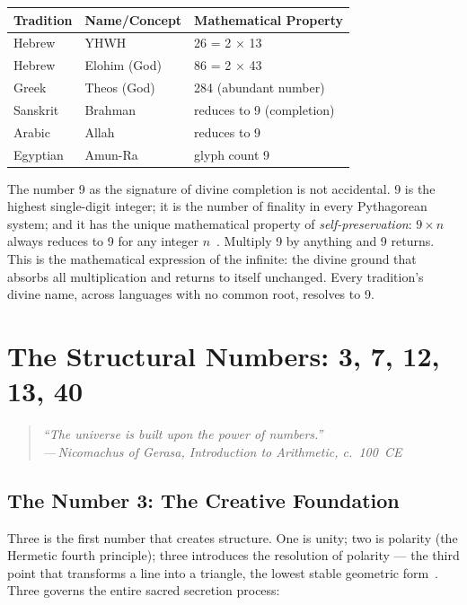 \documentclass[12pt, a4paper]{article}
\newcommand{\epigraph}[2]{%
  \begin{quote}
    \itshape ``#1''\\[0.3em]
    \normalfont\small\hfill ---\,#2
  \end{quote}
}
\begin{document}
\begin{center}
\begin{tabular}{C{3cm} C{4cm} C{4cm}}
\toprule
\textbf{Tradition} & \textbf{Name/Concept} & \textbf{Mathematical Property} \\
\midrule
Hebrew & YHWH & 26 = 2 × 13 \\
Hebrew & Elohim (God) & 86 = 2 × 43 \\
Greek & Theos (God) & 284 (abundant number) \\
Sanskrit & Brahman & reduces to 9 (completion) \\
Arabic & Allah & reduces to 9 \\
Egyptian & Amun-Ra & glyph count 9 \\
\bottomrule
\end{tabular}
\end{center}

\vspace{1em}

The number 9 as the signature of divine completion is not accidental. 9 is the
highest single-digit integer; it is the number of finality in every
Pythagorean system; and it has the unique mathematical property of
\emph{self-preservation}: $9 \times n$ always reduces to 9 for any integer
$n$~\autocite{westcott1911}. Multiply 9 by anything and 9 returns. This is
the mathematical expression of the infinite: the divine ground that absorbs
all multiplication and returns to itself unchanged. Every tradition's divine
name, across languages with no common root, resolves to 9.

\section{The Structural Numbers: 3, 7, 12, 13, 40}
\label{sec:structural}

\epigraph{The universe is built upon the power of numbers.}{Nicomachus of
Gerasa, \emph{Introduction to Arithmetic}, c.~100~CE}

\subsection{The Number 3: The Creative Foundation}

Three is the first number that creates structure. One is unity; two is polarity
(the Hermetic fourth principle); three introduces the resolution of polarity —
the third point that transforms a line into a triangle, the lowest stable
geometric form~\autocite{schneider1994}. Three governs the entire sacred
secretion process:
\end{document}
